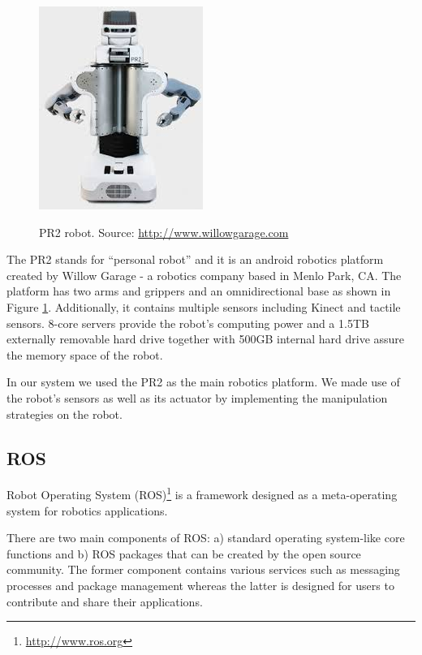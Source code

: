 \begin{figure}
\centering

{\includegraphics[width=0.5\columnwidth]{figures/pr2.jpeg}}

\caption{PR2 robot. Source: \url{http://www.willowgarage.com}}
\label{fig:pr2}
\end{figure}

The PR2 stands for ``personal robot'' and it is an android robotics platform created by Willow Garage - a robotics company based in Menlo Park, CA. The platform has two arms and grippers and an omnidirectional base as shown in Figure \ref{fig:pr2}. Additionally, it contains multiple sensors including Kinect and tactile sensors. 8-core servers provide the robot's computing power and a 1.5TB externally removable hard drive together with 500GB internal hard drive assure the memory space of the robot.  

In our system we used the PR2 as the main robotics platform. We made use of the robot's sensors as well as its actuator by implementing the manipulation strategies on the robot.

\subsection{ROS}
Robot Operating System (ROS)\footnote{\url{http://www.ros.org}} is a framework designed as a meta-operating system for robotics applications. 

There are two main components of ROS: a) standard operating system-like core functions and b) ROS packages that can be created by the open source community. The former component contains various services such as messaging processes and package management whereas the latter is designed for users to contribute and share their applications. 


